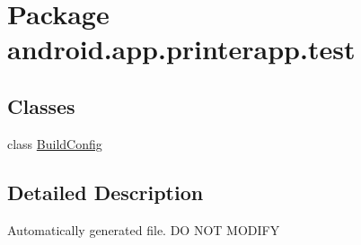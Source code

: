 \hypertarget{namespaceandroid_1_1app_1_1printerapp_1_1test}{}\section{Package android.\+app.\+printerapp.\+test}
\label{namespaceandroid_1_1app_1_1printerapp_1_1test}
\subsection*{Classes}
\begin{DoxyCompactItemize}
\item 
class \hyperlink{classandroid_1_1app_1_1printerapp_1_1test_1_1_build_config}{Build\+Config}
\end{DoxyCompactItemize}


\subsection{Detailed Description}
Automatically generated file. DO N\+OT M\+O\+D\+I\+FY 
